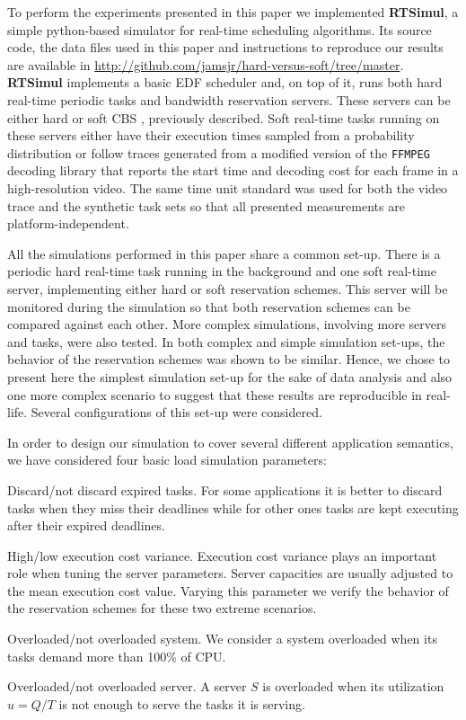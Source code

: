 \documentclass[times, 10pt,twocolumn]{article}
\newcommand{\simul}{\textbf{RTSimul}} %
\begin{document}
To perform the experiments presented in this paper we implemented
\simul{}, a simple python-based simulator for real-time scheduling
algorithms. Its source code, the data files used in this paper and
instructions to reproduce our results are available in
\url{http://github.com/jamsjr/hard-versus-soft/tree/master}. \simul{}
implements a basic EDF scheduler and, on top of it, runs both hard
real-time periodic tasks and bandwidth reservation servers. These
servers can be either hard \cite{buttazzo05:soft} or soft CBS
\cite{abeni.ea98:integrating}, previously described. Soft real-time
tasks running on these servers either have their execution times
sampled from a probability distribution or follow traces generated
from a modified version of the \texttt{FFMPEG} decoding library that
reports the start time and decoding cost for each frame in a
high-resolution video. The same time unit standard was used for both
the video trace and the synthetic task sets so that all presented
measurements are platform-independent.

All the simulations performed in this paper share a common
set-up. There is a periodic hard real-time task running in the
background and one soft real-time server, implementing either hard or
soft reservation schemes.  This server will be monitored during the
simulation so that both reservation schemes can be compared against
each other. More complex simulations, involving more servers and
tasks, were also tested. In both complex and simple simulation
set-ups, the behavior of the reservation schemes was shown to be
similar. Hence, we chose to present here the simplest simulation
set-up for the sake of data analysis and also one more complex
scenario to suggest that these results are reproducible in real-life.
Several configurations of this set-up were considered.

\label{sec:configurations}

In order to design our simulation to cover several different
application semantics, we have considered four basic load simulation
parameters:
\begin{description}
\item Discard/not discard expired tasks. For some applications it is
  better to discard tasks when they miss their deadlines while for
  other ones tasks are kept executing after their expired deadlines.
\item High/low execution cost variance. Execution cost variance plays
  an important role when tuning the server parameters. Server
  capacities are usually adjusted to the mean execution cost
  value. Varying this parameter we verify the behavior of the
  reservation schemes for these two extreme scenarios.
\item Overloaded/not overloaded system. We consider a system
  overloaded when its tasks demand more than 100\% of CPU.
\item Overloaded/not overloaded server. A server $S$ is overloaded
  when its utilization $u = Q/T$ is not enough to serve the tasks it
  is serving.
\end{description}
\end{document}
